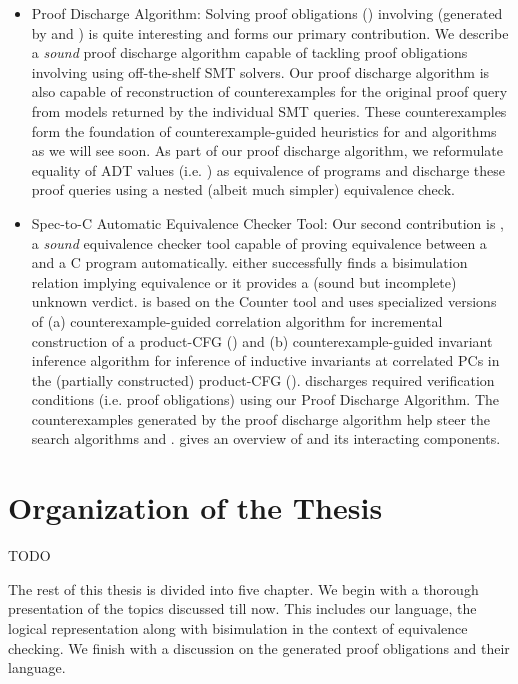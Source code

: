 \begin{itemize}
\item Proof Discharge Algorithm: Solving proof obligations () involving \recursiveRelations{}
(generated by  and ) is quite interesting and forms our primary contribution.
We describe a {\em sound} proof discharge algorithm capable of tackling proof obligations involving
\recursiveRelations{} using off-the-shelf SMT solvers. Our proof discharge algorithm is also capable of
reconstruction of counterexamples for the original proof query from models returned by the individual SMT queries.
These counterexamples form the foundation of counterexample-guided heuristics for  and  algorithms
as we will see soon.
As part of our proof discharge algorithm,
we reformulate equality of ADT values (i.e. \recursiveRelations{}) as equivalence of programs
and discharge these proof queries using a nested (albeit much simpler) equivalence check.

\item Spec-to-C Automatic Equivalence Checker Tool: Our second contribution is \toolName{}, a {\em sound} equivalence checker tool
capable of proving equivalence between a \SpecL{} and a C program automatically.
\toolName{} either successfully finds a bisimulation relation implying equivalence or it provides a (sound but incomplete) unknown verdict.
\toolName{} is based on the Counter tool\cite{oopsla20} and uses specialized versions of (a) counterexample-guided correlation algorithm for
incremental construction of a product-CFG () and (b) counterexample-guided invariant inference algorithm
for inference of inductive invariants at correlated PCs in the (partially constructed) product-CFG ().
\toolName{} discharges required verification conditions (i.e. proof obligations) using our Proof Discharge Algorithm.
The counterexamples generated by the proof discharge algorithm help steer the search algorithms  and .
 gives an overview of \toolName{} and its interacting components.
\end{itemize}



\section{Organization of the Thesis}
\label{sec:outline}
TODO

The rest of this thesis is divided into five chapter.
We begin with a thorough presentation of the topics discussed till now.
This includes our \SpecL{} language, the logical representation along with
bisimulation in the context of equivalence checking.
We finish with a discussion on the generated proof obligations and their language.

